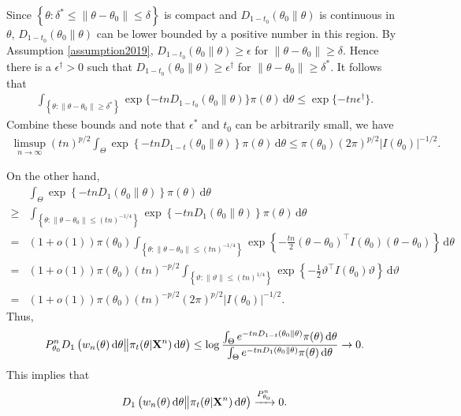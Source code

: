 \documentclass[11pt]{article}
\theoremstyle{plain}
\theoremstyle{definition}
\theoremstyle{remark}
\begin{document}
\begin{appendices}
Since $\left\{ \theta: \delta^* \leq \|\theta - \theta_0 \| \leq \delta \right\}$ is compact and $D_{1-t_0}(\theta_0 \| \theta)$ is continuous in $\theta$, $D_{1-t_0}(\theta_0 \| \theta)$ can be lower bounded by a positive number in this region.
By Assumption \ref{assumption2019},
$D_{1-t_0}\left( \theta_0 \| \theta \right) \geq \epsilon$ for $\|\theta - \theta_0\| \geq \delta$.
Hence there is a $\epsilon^\dagger > 0$ such that $D_{1-t_0} (\theta_0 \| \theta)\geq \epsilon^\dagger$ for $\|\theta- \theta_0\|\geq \delta^*$.
It follows that
\begin{align*}
        \int_{ \left\{ \theta: \|\theta - \theta_0\| \geq \delta^* \right\}} \exp\{-tn D_{1-t_0}(\theta_0 \| \theta)\} \pi (\theta) \, \mathrm d \theta
        \leq
        \exp\{-tn \epsilon^\dagger\}.
\end{align*}
Combine these bounds and note that $\epsilon^*$ and $t_0$ can be arbitrarily small, we have
\begin{align*}  
    \limsup_{n \to \infty}
    (tn)^{p/2}
    \int_{\Theta} \exp\left\{ -tn D_{1-t} (\theta_0 \| \theta) \right\} \pi(\theta) \, \mathrm d \theta
    \leq
    \pi(\theta_0) (2\pi)^{p/2} |I(\theta_0)|^{-1/2}.
\end{align*}

On the other hand, 
\begin{align*}
    &\int_{\Theta} \exp\left\{ -tn D_1 (\theta_0 \| \theta) \right\} \pi(\theta) \, \mathrm d \theta
    \\
    \geq
    &\int_{ \left\{ \theta: \|\theta - \theta_0\|\leq (tn)^{-1/4} \right\}} \exp\left\{ -tn D_1 (\theta_0 \| \theta) \right\} \pi(\theta) \, \mathrm d \theta
    \\
    =
    &(1+o(1))\pi(\theta_0)\int_{ \left\{ \theta: \|\theta - \theta_0\|\leq (tn)^{-1/4} \right\}} \exp \left\{ - \frac{tn}{2} (\theta- \theta_0)^\top I(\theta_0) (\theta- \theta_0) \right\}   \, \mathrm d \theta
    \\
    =
    &(1+o(1))\pi(\theta_0) (tn)^{-p/2} \int_{ \left\{ \vartheta: \|\vartheta\|\leq (tn)^{1/4} \right\}} \exp \left\{ - \frac{1}{2} \vartheta^\top I(\theta_0) \vartheta \right\} \, \mathrm d \vartheta
    \\
    =
    &(1+o(1))\pi(\theta_0) (tn)^{-p/2}
    (2\pi)^{p/2} |I(\theta_0)|^{-1/2}
    .
\end{align*}
Thus,
\begin{align*}
    P_{\theta_0}^n
     D_1\left( 
        w_n (\theta) \, \mathrm d \theta
        \big\|
        \pi_t (\theta | \mathbf{X}^{n}) \, \mathrm d \theta
    \right)
    \leq
    \log \frac{
        \int_{\Theta} e^{-tn D_{1-t}(\theta_0 \| \theta)} \pi (\theta) \, \mathrm d \theta
    }
    {
    \int_{\Theta} e^{-tn D_{1}(\theta_0 \| \theta)} \pi (\theta) \, \mathrm d \theta
}
\to 0
.
\end{align*}
This implies that
\begin{align*}
     D_1\left( 
        w_n (\theta) \, \mathrm d \theta
        \big\|
        \pi_t (\theta | \mathbf{X}^{n}) \, \mathrm d \theta
    \right)
    \xrightarrow{P_{\theta_0}^n} 0.
\end{align*}


\end{appendices}
\end{document}
